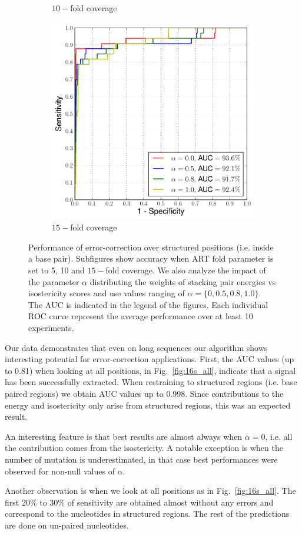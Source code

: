 \begin{figure}
\begin{subfigure}{.33\textwidth}
    \caption{$10-$fold coverage}
\end{subfigure}
\begin{subfigure}{.33\textwidth}
  \centering
  \includegraphics[width=\linewidth]{figures/15fold-b}
    \caption{$15-$fold coverage}
\end{subfigure}
\caption{Performance of error-correction over structured positions (i.e. inside a base pair). Subfigures show accuracy when
ART fold parameter is set to 5, 10 and $15-$fold coverage. We also analyze the impact of the parameter $\alpha$ distributing the weights of stacking pair energies vs isostericity scores and use values ranging of $\alpha = \{0, 0.5, 0.8, 1.0\}$. The AUC is indicated in the legend of the figures. Each individual ROC curve represent the average performance over at least 10 experiments.}
\label{fig:16s_bp}
\end{figure}

Our data demonstrates that even on long sequences our algorithm shows interesting potential for 
error-correction applications. First, the AUC values (up to 0.81) when looking at all positions, 
in Fig.~\ref{fig:16s_all},  indicate that a signal has been successfully extracted. When restraining
to structured regions (i.e. base paired regions) we obtain AUC values up to 0.998.  Since 
contributions to the energy and isostericity only arise from structured regions, this was an expected result.

An interesting feature is that best results are almost always when $\alpha=0$, i.e. all the contribution
comes from the isostericity. A notable exception is when the number of mutation is underestimated, 
in that case best performances were observed for non-null values of $\alpha$.

Another observation is when we look at all positions as in Fig.~\ref{fig:16s_all}. The first $20\%$ to $30\%$ of sensitivity are obtained almost without any errors and correspond to the nucleotides in 
structured regions. The rest of the predictions are done on un-paired nucleotides.

